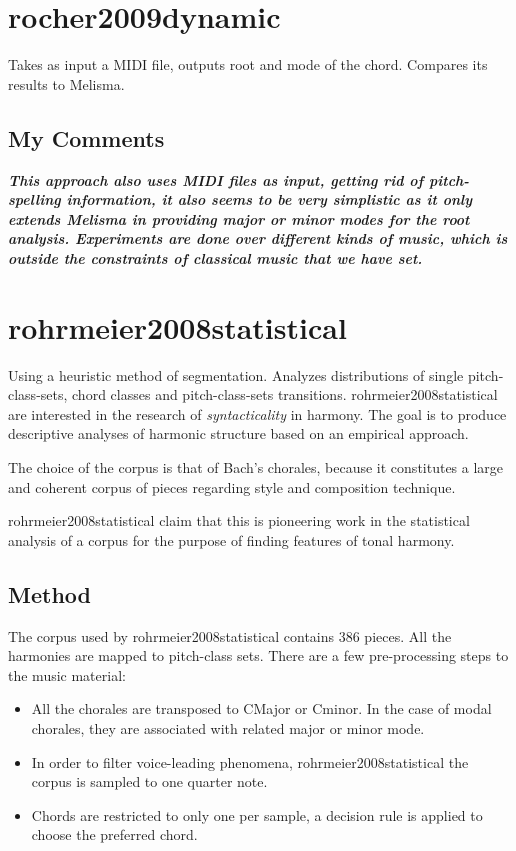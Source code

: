 \section{rocher2009dynamic }
  Takes as input a MIDI file, outputs root and mode of the chord. Compares its results to Melisma.
  \subsection{My Comments}
    \emph{\textbf{
      This approach also uses MIDI files as input, getting rid of pitch-spelling information, it also seems to be very simplistic as it only extends Melisma in providing major or minor modes for the root analysis. Experiments are done over different kinds of music, which is outside the constraints of classical music that we have set.
    }}
\section{rohrmeier2008statistical }
  Using a heuristic method of segmentation. Analyzes distributions of single pitch-class-sets, chord classes and pitch-class-sets transitions. rohrmeier2008statistical are interested in the research of \emph{syntacticality} in harmony. The goal is to produce descriptive analyses of harmonic structure based on an empirical approach.

  The choice of the corpus is that of Bach's chorales, because it constitutes a large and coherent corpus of pieces regarding style and composition technique.

  rohrmeier2008statistical claim that this is pioneering work in the statistical analysis of a corpus for the purpose of finding features of tonal harmony.

  \subsection{Method}
    The corpus used by rohrmeier2008statistical contains 386 pieces. All the harmonies are mapped to pitch-class sets.
    There are a few pre-processing steps to the music material:
    \begin{itemize}
      \item All the chorales are transposed to CMajor or Cminor. In the case of modal chorales, they are associated with related major or minor mode.
      \item In order to filter voice-leading phenomena, rohrmeier2008statistical the corpus is sampled to one quarter note.
      \item Chords are restricted to only one per sample, a decision rule is applied to choose the preferred chord.
    \end{itemize}

